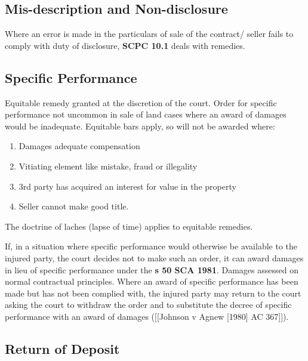 \documentclass[
]{article}
\providecommand{\tightlist}{%
  \setlength{\itemsep}{0pt}\setlength{\parskip}{0pt}}
\begin{document}
\hypertarget{mis-description-and-non-disclosure}{%
\subsection{Mis-description and
Non-disclosure}\label{mis-description-and-non-disclosure}}

Where an error is made in the particulars of sale of the contract/
seller fails to comply with duty of disclosure, \textbf{SCPC 10.1} deals
with remedies.

\hypertarget{specific-performance}{%
\subsection{Specific Performance}\label{specific-performance}}

Equitable remedy granted at the discretion of the court. Order for
specific performance not uncommon in sale of land cases where an award
of damages would be inadequate. Equitable bars apply, so will not be
awarded where:

\begin{enumerate}
\def\labelenumi{\arabic{enumi}.}
\tightlist
\item
  Damages adequate compensation
\item
  Vitiating element like mistake, fraud or illegality
\item
  3rd party has acquired an interest for value in the property
\item
  Seller cannot make good title.
\end{enumerate}

The doctrine of laches (lapse of time) applies to equitable remedies.

If, in a situation where specific performance would otherwise be
available to the injured party, the court decides not to make such an
order, it can award damages in lieu of specific performance under the
\textbf{s 50 SCA 1981}. Damages assessed on normal contractual
principles. Where an award of specific performance has been made but has
not been complied with, the injured party may return to the court asking
the court to withdraw the order and to substitute the decree of specific
performance with an award of damages ({[}{[}Johnson v Agnew {[}1980{]}
AC 367{]}{]}).

\hypertarget{return-of-deposit}{%
\subsection{Return of Deposit}\label{return-of-deposit}}
\end{document}
